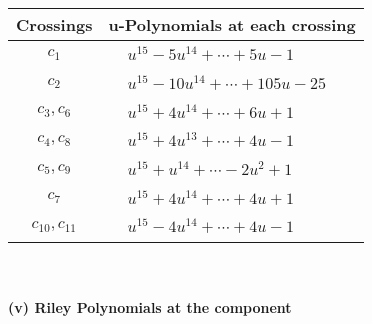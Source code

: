 \documentclass[1p]{elsarticle_modified}
\theoremstyle{definition}
\begin{document}
\begin{tabular}{m{50pt}|m{274pt}}
Crossings & \hspace{64pt}u-Polynomials at each crossing \\
\hline $$\begin{aligned}c_{1}\end{aligned}$$&$\begin{aligned}
&u^{15}-5 u^{14}+\cdots+5 u-1
\end{aligned}$\\
\hline $$\begin{aligned}c_{2}\end{aligned}$$&$\begin{aligned}
&u^{15}-10 u^{14}+\cdots+105 u-25
\end{aligned}$\\
\hline $$\begin{aligned}c_{3},c_{6}\end{aligned}$$&$\begin{aligned}
&u^{15}+4 u^{14}+\cdots+6 u+1
\end{aligned}$\\
\hline $$\begin{aligned}c_{4},c_{8}\end{aligned}$$&$\begin{aligned}
&u^{15}+4 u^{13}+\cdots+4 u-1
\end{aligned}$\\
\hline $$\begin{aligned}c_{5},c_{9}\end{aligned}$$&$\begin{aligned}
&u^{15}+u^{14}+\cdots-2 u^2+1
\end{aligned}$\\
\hline $$\begin{aligned}c_{7}\end{aligned}$$&$\begin{aligned}
&u^{15}+4 u^{14}+\cdots+4 u+1
\end{aligned}$\\
\hline $$\begin{aligned}c_{10},c_{11}\end{aligned}$$&$\begin{aligned}
&u^{15}-4 u^{14}+\cdots+4 u-1
\end{aligned}$\\
\hline
\end{tabular}\\~\\
\newpage\renewcommand{\arraystretch}{1}
\flushleft \textbf{(v) Riley Polynomials at the component}\newline \\
\end{document}
